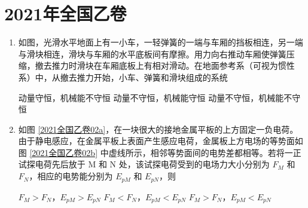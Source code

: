 \documentclass[\gkver]{gaokaozhenti}
\begin{document}
\chapter{2021年全国乙卷}

\begin{enumerate}
\item
如图，光滑水平地面上有一小车，一轻弹簧的一端与车厢的挡板相连，另一端与滑块相连，滑块与车厢的水平底板间有摩擦。用力向右推动车厢使弹簧压缩，撤去推力时滑块在车厢底板上有相对滑动。在地面参考系（可视为惯性系）中，从撤去推力开始，小车、弹簧和滑块组成的系统 


{动量守恒，机械能不守恒}
{动量不守恒，机械能守恒}
{动量不守恒，机械能不守恒}


\item
如图 \ref{2021全国乙卷02a}，在一块很大的接地金属平板的上方固定一负电荷。由于静电感应，在金属平板上表面产生感应电荷，金属板上方电场的等势面如图 \ref{2021全国乙卷02b} 中虚线所示，相邻等势面间的电势差都相等。若将一正试探电荷先后放于 M 和 N 处，该试探电荷受到的电场力大小分别为 $F_{M}$ 和 $F_{N}$，相应的电势能分别为 $E_{pM}$ 和 $E_{pN}$，则 


{$F_{M}>F_{N}$，$E_{pM}>E_{pN}$}
{$F_{M}<F_{N}$，$E_{pM}<E_{pN}$}
{$F_{M}>F_{N}$，$E_{pM}<E_{pN}$}

\end{enumerate}
\end{document}
